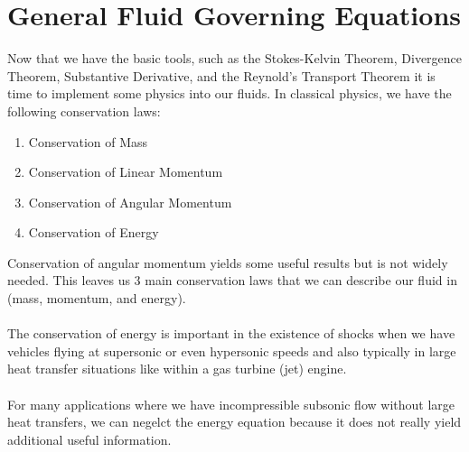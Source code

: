 \chapter{General Fluid Governing Equations}


Now that we have the basic tools, such as the Stokes-Kelvin Theorem, Divergence Theorem, Substantive Derivative, and the Reynold's Transport Theorem it is time to implement some physics into our fluids.
In classical physics, we have the following conservation laws:
\begin{enumerate}
\item Conservation of Mass
\item Conservation of Linear Momentum
\item Conservation of Angular Momentum
\item Conservation of Energy
\end{enumerate}
Conservation of angular momentum yields some useful results but is not widely needed.
This leaves us $3$ main conservation laws that we can describe our fluid in (mass, momentum, and energy).
\\~\\The conservation of energy is important in the existence of shocks when we have vehicles flying at supersonic or even hypersonic speeds and also typically in large heat transfer situations like within a gas turbine (jet) engine.
\\~\\For many applications where we have incompressible subsonic flow without large heat transfers, we can negelct the energy equation because it does not really yield additional useful information.

